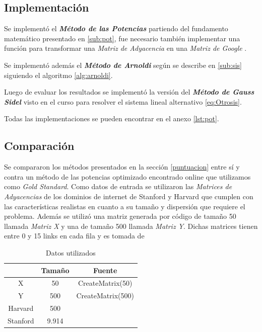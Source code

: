 \documentclass{article}
\begin{document}
\subsection{Implementación}

Se implementó el \textit{\textbf{Método de las Potencias}} partiendo del fundamento matemático presentado en \ref{sub:pot}, fue necesario también implementar una función para transformar una {\textit{Matriz de Adyacencia}} en una {\textit{Matriz de Google}} . 

Se implementó además el \textit{\textbf{Método de Arnoldi}} según se describe en \ref{sub:sis} siguiendo el algoritmo \ref{alg:arnoldi}. 

Luego de evaluar los resultados se implementó la versión del \textbf{\textit{Método de Gauss Sidel}} visto en el curso para resolver el sistema lineal alternativo \ref{eq:Otrosis}.

Todas las implementaciones se pueden encontrar en el anexo \ref{lst:pot}.

\subsection{Comparación}

Se compararon los métodos presentados en la sección \ref{puntuacion} entre sí y contra un método de las potencias optimizado encontrado online que utilizamos como \textit{Gold Standard}.
Como datos de entrada se utilizaron las \textit{Matrices de Adyacencias} de los dominios de internet de Stanford y Harvard que cumplen con las características realistas en cuanto a su tamaño y dispersión que requiere el problema. 
Además se utilizó una matriz generada por código de tamaño 50 llamada \textit{Matriz X} y una de tamaño 500 llamada \textit{Matriz Y}.  Dichas matrices tienen entre 0 y 15 links en cada fila y es tomada de \cite{andersson2004investigating}

\begin{table}[ht!]
  \begin{center}
    \caption{Datos utilizados}
    \label{tab:tableDatos}
    \begin{tabular}{ccc}
      \toprule
       & Tamaño & Fuente\\
      \midrule
      X &50  &  CreateMatrix(50)  \\
      Y &500 & CreateMatrix(500) \\
      Harvard & 500 & \cite[harvard500.mat]{HARVARDMAt}  \\
      Stanford & 9.914 & \cite[wb-cs-stanford.mat]{STANFORDMAt}  \\
      \bottomrule
    \end{tabular}
  \end{center}
\end{table}
\end{document}
